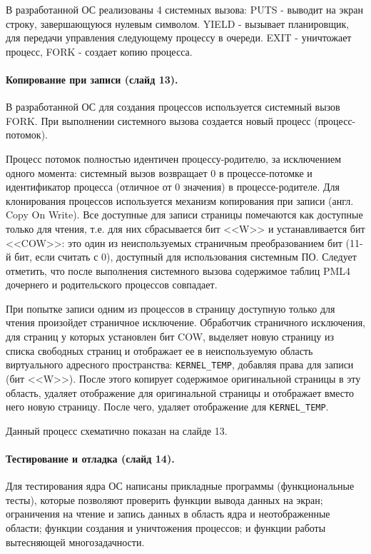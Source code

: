 \documentclass[12pt]{article}
\begin{document}
В разработанной ОС реализованы 4 системных вызова: PUTS - выводит на экран строку, завершающуюся нулевым
символом. YIELD - вызывает планировщик, для передачи управления следующему процессу в очереди. EXIT -
уничтожает процесс, FORK - создает копию процесса.

\paragraph{Копирование при записи (слайд 13).}
В разработанной ОС для создания процессов используется системный вызов FORK. При выполнении системного
вызова создается новый процесс (процесс-потомок).

Процесс потомок полностью идентичен процессу-родителю, за исключением одного момента: системный вызов
возвращает 0 в процессе-потомке и идентификатор процесса (отличное от 0 значения) в процессе-родителе. Для
клонирования процессов используется механизм копирования при записи (англ. Copy On Write). Все доступные для записи
страницы помечаются как доступные только для чтения, т.е. для них сбрасывается бит <<W>> и устанавливается бит <<COW>>:
это один из неиспользуемых страничным преобразованием бит (11-й бит, если считать с 0), доступный для использования
системным ПО. Следует отметить, что после выполнения системного вызова содержимое таблиц PML4 дочернего и родительского
процессов совпадает.

При попытке записи одним из процессов в страницу доступную только для чтения произойдет страничное исключение.
Обработчик страничного исключения, для страниц у которых установлен бит COW, выделяет новую страницу из списка
свободных страниц и отображает ее в неиспользуемую область виртуального адресного пространства: \texttt{KERNEL\_TEMP},
добавляя права для записи (бит <<W>>). После этого копирует содержимое оригинальной страницы в эту область, удаляет
отображение для оригинальной страницы и отображает вместо него новую страницу. После чего, удаляет отображение для
\texttt{KERNEL\_TEMP}.

Данный процесс схематично показан на слайде 13.

\paragraph{Тестирование и отладка (слайд 14).}
Для тестирования ядра ОС написаны прикладные программы (функциональные тесты), которые позволяют
проверить функции вывода данных на экран; ограничения на чтение и запись данных в область ядра
и неотображенные области; функции создания и уничтожения процессов; и функции работы вытесняющей многозадачности.
\end{document}
